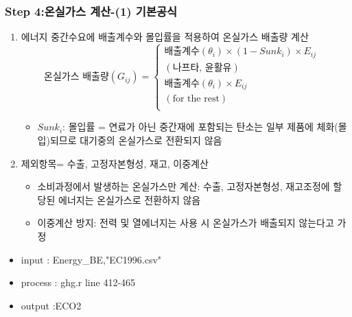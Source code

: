 \documentclass[10pt,compress,slidetop,%
			   hyperref={unicode},xcolor={svgnames},%
			   t]{beamer}
\begin{document}
\begin{frame}
	\frametitle{Step 4:온실가스 계산-(1) 기본공식}
\bigskip
\begin{enumerate}
\item{에너지 중간수요에 배출계수와 몰입률을 적용하여 온실가스 배출량 계산} 
\smallskip
\begin{displaymath}
			\mbox{온실가스 배출량} (G_{ij})=\left\{\begin{array}{lr}
\mbox{배출계수}(\theta_i)\times (1-Sunk_i)\times E_{ij}&\\
(\mbox{나프타, 윤활유})& \\
\mbox{배출계수}(\theta_i)\times E_{ij}&\\
(\mbox{for the rest})&\\
\end{array}\right.
\end{displaymath}
\begin{itemize}
\item{$Sunk_i$: 몰입률 = 연료가 아닌 중간재에 포함되는 탄소는 일부 제품에 체화(몰입)되므로 대기중의 온실가스로 전환되지 않음}
\end{itemize}
\bigskip
\item{제외항목= 수출, 고정자본형성, 재고, 이중계산}
\begin{itemize}
\item{소비과정에서 발생하는 온실가스만 계산: 수출, 고정자본형성, 재고조정에 할당된 에너지는 온실가스로 전환하지 않음}
\item{이중계산 방지: 전력 및 열에너지는 사용 시 온실가스가 배출되지 않는다고 가정}
\end{itemize}
\end{enumerate}
\begin{small}
\begin{itemize}
\item{input : Energy\_BE,"EC1996.csv"}
\item{process : ghg.r line 412-465}
\item{output :ECO2}
\end{itemize} 
\end{small}	
\end{frame}
\end{document}
